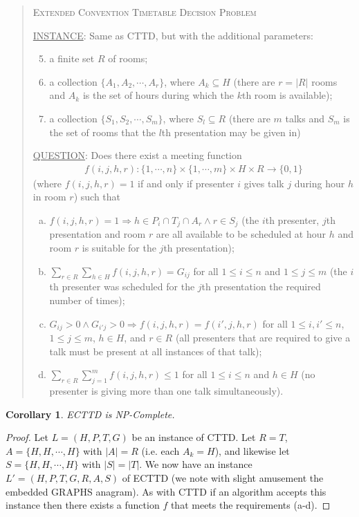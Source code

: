 \documentclass[]{article}
\newtheorem{cor}[thm]{Corollary}
\theoremstyle{definition}
\theoremstyle{remark}
\numberwithin{equation}{section}
\begin{document}
\begin{quote}
	\textsc{Extended Convention Timetable Decision Problem}
	
	\underline{INSTANCE}: Same as CTTD, but with the additional parameters:
		\begin{enumerate}[1.]
			\setcounter{enumi}{4}
			\item a finite set $R$ of rooms;
			\item a collection $\{A_1,A_2,\cdots,A_r\}$, where $A_k \subseteq H$ (there are $r=|R|$ rooms and $A_k$ is the set of hours during which the $k$th room is available);
			\item a collection $\{S_1,S_2,\cdots,S_m\}$, where $S_l \subseteq R$ (there are $m$ talks and $S_m$ is the set of rooms that the $l$th presentation may be given in)
		\end{enumerate}
	\underline{QUESTION}: Does there exist a meeting function 
		\begin{gather*}
			f(i,j,h,r) : \{1,\cdots,n\} \times \{1,\cdots,m\} \times H \times R \rightarrow \{0,1\}
		\end{gather*}
		(where $f(i,j,h,r)=1$ if and only if presenter $i$ gives talk $j$ during hour $h$ in room $r$) such that
		\begin{enumerate}[(a)]
			\item $f(i,j,h,r) = 1 \Rightarrow h \in P_i \cap T_j \cap A_r \land r \in S_j$ (the $i$th presenter, $j$th presentation and room $r$ are all available to be scheduled at hour $h$ and room $r$ is suitable for the $j$th presentation);
			\item $\sum\limits_{r \in R}\sum\limits_{h \in H} f(i,j,h,r) = G_{ij}$ for all $1 \le i \le n$ and $1 \le j \le m$ (the $i$th presenter was scheduled for the $j$th presentation the required number of times);
			\item $G_{ij} > 0 \land G_{i'j} > 0 \Rightarrow f(i,j,h,r)=f(i',j,h,r)$ for all $1 \le i,i' \le n$, $1 \le j \le m$, $h \in H$, and $r \in R$ (all presenters that are required to give a talk must be present at all instances of that talk);
			\item $\sum\limits_{r \in R}\sum\limits_{j=1}^m f(i,j,h,r) \le 1$ for all $1 \le i \le n$ and $h \in H$ (no presenter is giving more than one talk simultaneously).
		\end{enumerate}
\end{quote}
\begin{cor}
ECTTD is NP-Complete.
\end{cor}
\begin{proof}
Let $L=(H,P,T,G)$ be an instance of CTTD. Let $R=T$, $A=\{H,H,\cdots,H\}$ with $|A|=R$ (i.e. each $A_k=H$), and  likewise let $S=\{H,H,\cdots,H\}$ with $|S|=|T|$. We now have an instance $L'=(H,P,T,G,R,A,S)$ of ECTTD (we note with slight amusement the embedded GRAPHS anagram). As with CTTD if an algorithm accepts this instance then there exists a function $f$ that meets the requirements (a-d).
\end{proof}
\end{document}
